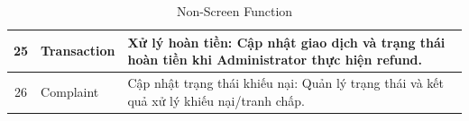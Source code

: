 \begin{table}[H]
\begin{tabular}{|c|p{3cm}|p{6cm}|}
		25 & Transaction & Xử lý hoàn tiền: Cập nhật giao dịch và trạng thái hoàn tiền khi Administrator thực hiện refund. \\
		\hline
		
		26 & Complaint & Cập nhật trạng thái khiếu nại: Quản lý trạng thái và kết quả xử lý khiếu nại/tranh chấp. \\
		\hline
		
	\end{tabular}
	\caption{Non-Screen Function}
	\label{tab:non-screen-function}
\end{table}